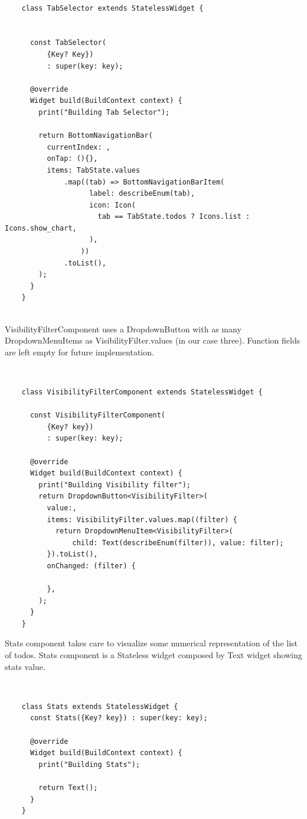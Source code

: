 	\mbox{}\\
	
	 \mbox{}
	\begin{verbatim}
	class TabSelector extends StatelessWidget {
	
	
	  const TabSelector(
	      {Key? Key})
	      : super(key: key);
	
	  @override
	  Widget build(BuildContext context) {
	    print("Building Tab Selector");
	
	    return BottomNavigationBar(
	      currentIndex: ,
	      onTap: (){},
	      items: TabState.values
	          .map((tab) => BottomNavigationBarItem(
	                label: describeEnum(tab),
	                icon: Icon(
	                  tab == TabState.todos ? Icons.list : Icons.show_chart,
	                ),
	              ))
	          .toList(),
	    );
	  }
	}
	
	\end{verbatim}
	
	\mbox{}
	
	VisibilityFilterComponent uses a DropdownButton with as many DropdownMenuItems as VisibilityFilter.values (in our case three). Function fields are left empty for future implementation.
	
	\mbox{}\\
	
	 \mbox{}
	\begin{verbatim}
	class VisibilityFilterComponent extends StatelessWidget {
	
	  const VisibilityFilterComponent(
	      {Key? key})
	      : super(key: key);
	
	  @override
	  Widget build(BuildContext context) {
	    print("Building Visibility filter");
	    return DropdownButton<VisibilityFilter>(
	      value:,
	      items: VisibilityFilter.values.map((filter) {
	        return DropdownMenuItem<VisibilityFilter>(
	            child: Text(describeEnum(filter)), value: filter);
	      }).toList(),
	      onChanged: (filter) {
	       
	      },
	    );
	  }
	}
	\end{verbatim}
	
	\mbox{}
	
	Stats component takes care to visualize some numerical representation of the list of todos. Stats component is a Stateless widget composed by Text widget showing stats value.
	
	\mbox{}\\
	
	 \mbox{}
	\begin{verbatim}
	class Stats extends StatelessWidget {
	  const Stats({Key? key}) : super(key: key);
	
	  @override
	  Widget build(BuildContext context) {
	    print("Building Stats");
	
	    return Text();
	  }
	}
	\end{verbatim}
	
	\mbox{}
	
	

